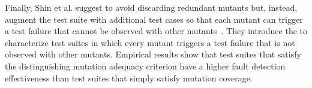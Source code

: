 Finally, Shin et al. suggest to avoid discarding redundant mutants but, instead, augment the test suite with additional test cases so that 
each mutant can trigger a test failure that cannot be observed with other mutants~\cite{Shin:TSE:DCriterion:2018}. 
They introduce the  to characterize test suites in which every mutant triggers a test failure that is not observed with other mutants.
Empirical results show that test suites that satisfy the distinguishing mutation adequacy criterion have a higher
 fault detection effectiveness than test suites that simply satisfy mutation coverage.



